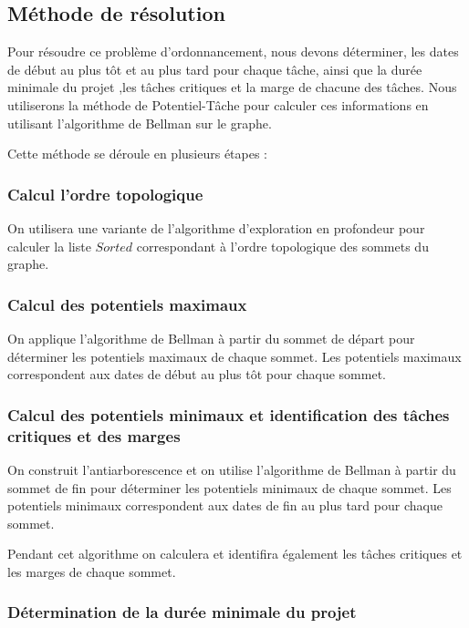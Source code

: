 \documentclass{article}
\begin{document}
\subsection{Méthode de résolution}

Pour résoudre ce problème d'ordonnancement, nous devons déterminer, les dates de début au plus tôt et au plus tard pour chaque tâche, ainsi que la durée minimale du projet ,les tâches critiques et la marge de chacune des tâches. Nous utiliserons la méthode de Potentiel-Tâche pour calculer ces informations en utilisant l'algorithme de Bellman sur le graphe.

Cette méthode se déroule en plusieurs étapes :

\subsubsection{Calcul l'ordre topologique}

On utilisera une variante de l'algorithme d'exploration en profondeur pour calculer la liste $Sorted$ correspondant à l'ordre topologique des sommets du graphe.

\subsubsection{Calcul des potentiels maximaux}

On applique l'algorithme de Bellman à partir du sommet de départ pour déterminer les potentiels maximaux de chaque sommet. Les potentiels maximaux correspondent aux dates de début au plus tôt pour chaque sommet.

\subsubsection{Calcul des potentiels minimaux et identification des tâches critiques et des marges}

On construit l'antiarborescence et on utilise l'algorithme de Bellman à partir du sommet de fin pour déterminer les potentiels minimaux de chaque sommet. Les potentiels minimaux correspondent aux dates de fin au plus tard pour chaque sommet.

Pendant cet algorithme on calculera et identifira également les tâches critiques et les marges de chaque sommet.

\subsubsection{Détermination de la durée minimale du projet}
\end{document}
